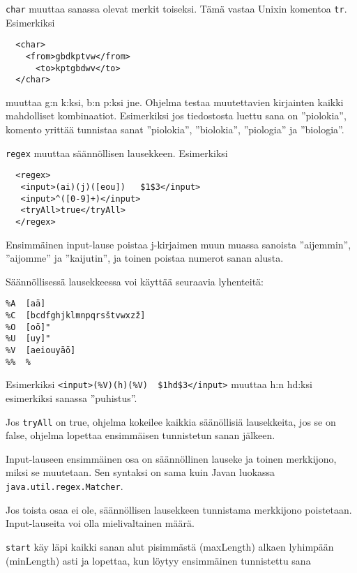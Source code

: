\documentclass[12pt]{article}
\begin{document}


\bigskip
\verb|char| muuttaa sanassa olevat merkit toiseksi. Tämä vastaa Unixin
komentoa \verb|tr|. Esimerkiksi

\begin{verbatim}
  <char>
    <from>gbdkptvw</from>
      <to>kptgbdwv</to>
  </char>
\end{verbatim}

muuttaa g:n k:ksi, b:n p:ksi jne. Ohjelma testaa muutettavien
kirjainten kaikki mahdolliset kombinaatiot. Esimerkiksi jos
tiedostosta luettu sana on ''piolokia'', komento yrittää tunnistaa
sanat ''piolokia'', ''biolokia'', ''piologia'' ja ''biologia''.




\verb|regex| muuttaa säännöllisen lausekkeen. Esimerkiksi

\begin{verbatim}
  <regex>
   <input>(ai)(j)([eou])   $1$3</input>
   <input>^([0-9]+)</input>
   <tryAll>true</tryAll>
  </regex>
\end{verbatim}

Ensimmäinen input-lause poistaa j-kirjaimen muun muassa sanoista
''aijemmin'', ''aijomme'' ja ''kaijutin'', ja toinen poistaa numerot
sanan alusta.


Säännöllisessä lausekkeessa voi käyttää seuraavia lyhenteitä:

\begin{verbatim}
%A  [aä]
%C  [bcdfghjklmnpqrsštvwxzž]
%O  [oö]"
%U  [uy]"
%V  [aeiouyäö]
%%  %
\end{verbatim}

Esimerkiksi \verb=<input>(%V)(h)(%V)  $1hd$3</input>=
muuttaa h:n hd:ksi esimerkiksi sanassa ''puhistus''.


Jos \verb=tryAll= on true, ohjelma kokeilee kaikkia säänöllisiä
lausekkeita, jos se on false, ohjelma lopettaa ensimmäisen tunnistetun
sanan jälkeen.

Input-lauseen ensimmäinen osa on säännöllinen lauseke ja toinen
merkkijono, miksi se muutetaan. Sen syntaksi on sama kuin Javan
luokassa \verb=java.util.regex.Matcher=.

Jos toista osaa ei ole, säännöllisen lausekkeen tunnistama merkkijono
poistetaan. Input-lauseita voi olla mielivaltainen määrä.




\bigskip
\verb=start= käy läpi kaikki sanan alut pisimmästä (maxLength) alkaen
lyhimpään (minLength) asti ja lopettaa, kun löytyy ensimmäinen
tunnistettu sana
\end{document}
